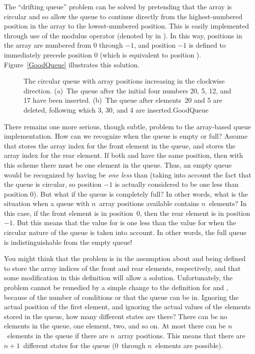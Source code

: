 The ``drifting queue'' problem can be solved by pretending that the
array is circular and so allow the queue to continue directly from
the highest-numbered position in the array to the lowest-numbered
position.
This is easily implemented through use of the modulus operator
(denoted by \Cref{\%} in \Lang).
In this way, positions in the array are numbered from 0 through
$-1$, and position $-1$ is defined to
immediately precede position 0 (which is equivalent
to position ).
Figure~\ref{GoodQueue} illustrates this solution.

\begin{figure}
\vspace{-\medskipamount}

{The circular queue with array positions increasing in the clockwise
direction.
(a)~The queue after the initial four numbers 20, 5, 12, and 17 have been
inserted.
(b)~The queue after elements~20 and 5 are deleted, following which 3,
30, and 4 are inserted.}{GoodQueue}
\bigskip
\end{figure}

There remains one more serious, though subtle, problem to the
array-based queue implementation.
How can we recognize when the queue is empty or full?
Assume that  stores the array index for the front element
in the queue, and  stores the array index for the rear
element.
If both  and  have the same position, then
with this scheme there must be one element in the queue.
Thus, an empty queue would be recognized by having  be
\emph{one less} than  (taking into account the fact that
the queue is circular, so position $-1$ is actually
considered to be one less than position 0).
But what if the queue is completely full?
In other words, what is the situation when a queue with $n$~array
positions available contains $n$~elements?
In this case, if the front element is in position~0, then the rear
element is in position $-1$.
But this means that the value for  is one less than the
value for  when the circular nature of the queue is taken
into account.
In other words, the full queue is indistinguishable from the empty
queue!

You might think that the problem is in the assumption about
 and  being defined to store the array indices
of the front and rear elements, respectively, and that some
modification in this definition will allow a solution.
Unfortunately, the problem cannot be remedied by a simple change to
the definition for  and , because of
the number of conditions or  that the queue can be in.
Ignoring the actual position of the first element, and ignoring the
actual values of the elements stored in the queue, how many different
states are there?
There can be no elements in the queue, one element, two, and so on.
At most there can be $n$~elements in the queue if there are $n$~array
positions.
This means that there are $n+1$~different states for the queue
(0~through $n$~elements are possible).

